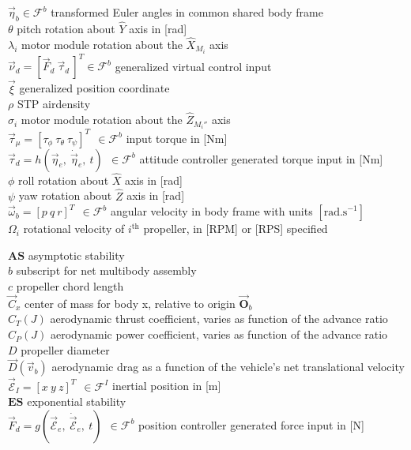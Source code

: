 \documentclass[a4paper, 11pt, oneside, openright, parskip=full]{book}
\begin{document}
$\vec{\eta}_b \in\mathcal{F}^b$ transformed Euler angles in common shared body frame\\
$\theta$ pitch rotation about $\hat{Y}$ axis in [rad] \\
$\lambda_i$ motor module rotation about the $\hat{X}_{M_i}$ axis\\
$\vec{\nu}_d=[\vec{F}_d~\vec{\tau}_d\hspace{2pt}]^T\in\mathcal{F}^b$ generalized virtual control input\\
$\vec{\xi}$ generalized position coordinate\\
$\rho$ STP airdensity\\
$\sigma_i$ motor module rotation about the $\hat{Z}_{M_i''}$ axis\\
$\vec{\tau}_\mu = [\tau_\phi~\tau_\theta~\tau_\psi]^T~~\in\mathcal{F}^b$ input torque in [Nm]\\
$\vec{\tau}_d = h(\vec{\eta}_e,~\dot{\vec{\eta}}_e,~t)~~\in\mathcal{F}^b$ attitude controller generated torque input in [Nm]\\
$\phi$ roll rotation about $\hat{X}$ axis in [rad] \\
$\psi$ yaw rotation about $\hat{Z}$ axis in [rad]\\
$\vec{\omega}_b=[p~q~r]^T~~\in\mathcal{F}^b$ angular velocity in body frame with units $[\text{rad.s}^{-1}]$\\
$\Omega_i$ rotational velocity of $i^{\text{th}}$ propeller, in [RPM] or [RPS] specified\\
\par
$\mathbf{AS}$ asymptotic stability\\
$b$ subscript for net multibody assembly\\
$c$ propeller chord length\\
$\vec{C}_x$ center of mass for body x, relative to origin $\vec{\mathbf{O}}_b$\\
$C_T(J)$ aerodynamic thrust coefficient, varies as function of the advance ratio\\
$C_P(J)$ aerodynamic power coefficient, varies as function of the advance ratio\\
$D$ propeller diameter\\
$\vec{D}(\vec{v}_b)$ aerodynamic drag as a function of the vehicle's net translational velocity\\
$\vec{\mathcal{E}}_I=[x~y~z]^T~~\in\mathcal{F}^{I}$ inertial position in [m]\\
$\mathbf{ES}$ exponential stability\\
$\vec{F}_d=g(\vec{\mathcal{E}}_e,~\dot{\vec{\mathcal{E}}}_e,~t)~~\in\mathcal{F}^b$ position controller generated force input in [N]\\
\end{document}
